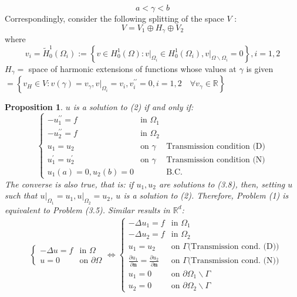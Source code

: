 \documentclass[11pt]{book}
\newtheorem{proposition}{Proposition}
\begin{document}
$$
a<\gamma<b
$$
Correspondingly, consider the following splitting of the space $V$ :
$$
V=V_{1} \oplus H_{\gamma} \oplus V_{2}
$$
where
$$
v_{i}=\tilde{H}_{0}^{1}\left(\Omega_{i}\right):=\left\{v \in H_{0}^{1}(\Omega):\left.v\right|_{\Omega_{i}} \in H_{0}^{1}\left(\Omega_{i}\right),\left.v\right|_{\Omega \backslash \Omega_{i}}=0\right\}, i=1,2
$$
$H_{\gamma}=$ space of harmonic extensions of functions whose values at $\gamma$ is given $=\left\{v_{H} \in V: v(\gamma)=v_{\gamma},\left.v\right|_{\Omega_{i}}=v_{i}, v_{i}^{\prime \prime}=0, i=1,2 \quad \forall v_{\gamma} \in \mathbb{R}\right\}$

\begin{proposition}
$u$ is a solution to (2) if and only if:
\[
\left\{\begin{array}{lll}
-u_{1}^{\prime \prime}=f & \text{in } \Omega_{1} & \\
-u_{2}^{\prime \prime}=f & \text{in } \Omega_{2} & \\
u_{1}=u_{2} & \text{on } \gamma & \text{Transmission condition (D)} \\
u_{1}^{\prime}=u_{2}^{\prime} & \text{on } \gamma & \text{Transmission condition (N)} \\
u_{1}(a)=0, u_{2}(b)=0 & & \text{B.C.}
\end{array}\right.
\]
The converse is also true, that is: if $u_{1}, u_{2}$ are solutions to (3.8), then, setting $u$ such that $\left.u\right|_{\Omega_{1}}=u_{1},\left.u\right|_{\Omega_{2}}=u_{2}$, $u$ is a solution to (2).
Therefore, Problem (1) is equivalent to Problem (3.5).
Similar results in $\mathbb{R}^{d}$:
\[
\begin{aligned}
& \left\{\begin{array}{ll} 
- \Delta u = f & \text{in } \Omega \\
u = 0 & \text{on } \partial \Omega
\end{array} \right. \Longleftrightarrow \left\{\begin{array}{ll}
-\Delta u_{1}=f & \text{in } \Omega_{1} \\
-\Delta u_{2}=f & \text{in } \Omega_{2} \\
u_{1}=u_{2} & \text{on } \Gamma \text{(Transmission cond. (D))} \\
\frac{\partial u_{1}}{\partial \mathbf{n}}=\frac{\partial u_{2}}{\partial \mathbf{n}} & \text{on } \Gamma \text{(Transmission cond. (N))} \\
u_{1}=0 & \text{on } \partial \Omega_{1} \backslash \Gamma \\
u_{2}=0 & \text{on } \partial \Omega_{2} \backslash \Gamma
\end{array}\right.
\end{aligned}
\]
\end{proposition}
\end{document}
